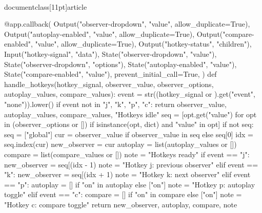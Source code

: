 \\documentclass[11pt]{article}
\begin{document}
\begin{CodeBlock}
{{{{{{{{@app.callback(
    Output("observer-dropdown", "value", allow_duplicate=True),
    Output("autoplay-enabled", "value", allow_duplicate=True),
    Output("compare-enabled", "value", allow_duplicate=True),
    Output("hotkey-status", "children"),
    Input("hotkey-signal", "data"),
    State("observer-dropdown", "value"),
    State("observer-dropdown", "options"),
    State("autoplay-enabled", "value"),
    State("compare-enabled", "value"),
    prevent_initial_call=True,
)
def handle_hotkeys(hotkey_signal, observer_value, observer_options, autoplay_values, compare_values):
    event = str((hotkey_signal or {}).get("event", "none")).lower()
    if event not in {"j", "k", "p", "c"}:
        return observer_value, autoplay_values, compare_values, "Hotkeys idle"
    seq = [opt.get("value") for opt in (observer_options or []) if isinstance(opt, dict) and "value" in opt]
    if not seq:
        seq = ["global"]
    cur = observer_value if observer_value in seq else seq[0]
    idx = seq.index(cur)
    new_observer = cur
    autoplay = list(autoplay_values or [])
    compare = list(compare_values or [])
    note = "Hotkeys ready"
    if event == "j":
        new_observer = seq[(idx - 1) %
        note = "Hotkey j: previous observer"
    elif event == "k":
        new_observer = seq[(idx + 1) %
        note = "Hotkey k: next observer"
    elif event == "p":
        autoplay = [] if "on" in autoplay else ["on"]
        note = "Hotkey p: autoplay toggle"
    elif event == "c":
        compare = [] if "on" in compare else ["on"]
        note = "Hotkey c: compare toggle"
    return new_observer, autoplay, compare, note


}}}}}}}}
\end{CodeBlock}
\end{document}
